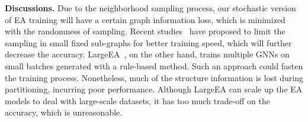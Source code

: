 \noindent
\textbf{Discussions.}
Due to the neighborhood sampling process, our stochastic version of EA training will have a certain graph information loss, which is minimized with the randomness of sampling. Recent studies~\cite{ClusterGCN} have proposed to limit the sampling in small fixed sub-graphs for better training speed, which will further decrease the accuracy.
LargeEA~\cite{LargeEA22}, on the other hand, trains multiple GNNs on small batches generated with a rule-based method. Such an approach could fasten the training process. Nonetheless, much of the structure information is lost during partitioning, incurring poor performance. Although LargeEA can scale up the EA models to deal with large-scale datasets, it has too much trade-off on the accuracy, which is unreasonable.






